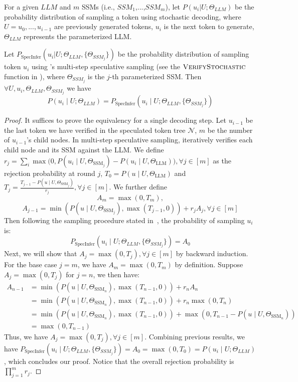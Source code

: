 \begin{theorem}
\label{specinfer:thm:stochastic_sampling}
For a given $LLM$ and $m$ SSMs (i.e., $SSM_1$,...,$SSM_m$), let $P(u_i | U; \Theta_{LLM})$ be the probability distribution of sampling a token using stochastic decoding, where $U = u_0,...,u_{i-1}$ are previously generated tokens, $u_i$ is the next token to generate, $\Theta_{LLM}$ represents the parameterized LLM.

Let $P_{\mathrm{SpecInfer}}(u_i | U; \Theta_{LLM}, \{\Theta_{SSM_j}\})$ be the probability distribution of sampling token $u_i$ using \SpecInfer's multi-step speculative sampling (see the $\textproc{VerifyStochastic}$ function in ), where $\Theta_{SSM_j}$ is the $j$-th parameterized SSM. Then $ \forall U, u_i, \Theta_{LLM}, \Theta_{SSM_j}$ we have
\begin{equation}
P(u_i \mid U; \Theta_{LLM}) = P_{\mathrm{SpecInfer}}(u_i \mid U; \Theta_{LLM}, \{\Theta_{SSM_j}\})
\end{equation}
\end{theorem}

\begin{proof}
It suffices to prove the equivalency for a single decoding step.
Let $u_{i-1}$ be the last token we have verified in the speculated token tree $\mathcal{N}$, $m$ be the number of $u_{i-1}$'s child nodes. In multi-step speculative sampling, \SpecInfer iteratively verifies each child node and its SSM against the LLM.
We define $r_j=\sum_i \max\big(0, P(u_i \mid U, \Theta_{\textrm{SSM}_j})-P(u_i \mid U, \Theta_{\textrm{LLM}})\big), \forall j \in [m]$ as the rejection probability at round $j$, $T_0 = P(u \mid U, \Theta_{\textrm{LLM}})$ and $T_{j}=\frac{T_{j-1}-P(u \mid U, \Theta_{\textrm{SSM}_j})}{r_j}, \forall j \in [m]$.
We further define $$A_m = \max(0, T_m),$$ $$A_{j-1} = \min(P(u \mid U, \Theta_{\textrm{SSM}_j}), \max(T_{j-1}, 0))+r_{j}A_j, \forall j \in [m]$$
Then following the  sampling procedure stated in~, the probability of sampling $u_i$ is:
$$P_{\mathrm{SpecInfer}}(u_i \mid U; \Theta_{LLM}, \{\Theta_{SSM_j}\}) = A_0$$
Next, we will show that $A_j = \max(0, T_j), \forall j \in [m]$ by backward induction.
For the base case $j=m$, we have $A_m = \max(0, T_m)$ by definition. Suppose $A_j = \max(0, T_j)$ for $j=n$, we then have:
\begin{align*}
    A_{n-1} &= \min(P(u \mid U, \Theta_{\textrm{SSM}_n}), \max(T_{n-1}, 0))+r_{n}A_n \\
    &= \min(P(u \mid U, \Theta_{\textrm{SSM}_n}), \max(T_{n-1}, 0))+r_{n}\max(0, T_n) \\
    &= \min(P(u \mid U, \Theta_{\textrm{SSM}_n}), \max(T_{n-1}, 0))+\max(0, T_{n-1}-P(u \mid U, \Theta_{\textrm{SSM}_n})) \\
    &= \max(0, T_{n-1})
\end{align*}
Thus, we have $A_j = \max(0, T_j), \forall j \in [m]$.
Combining previous results, we have $P_{\mathrm{SpecInfer}}(u_i \mid U; \Theta_{LLM}, \{\Theta_{SSM_j}\}) = A_0 = \max(0, T_0) = P(u_i \mid U; \Theta_{LLM})$, which concludes our proof. Notice that the overall rejection probability is $\prod_{j=1}^m r_j$.
\end{proof}

